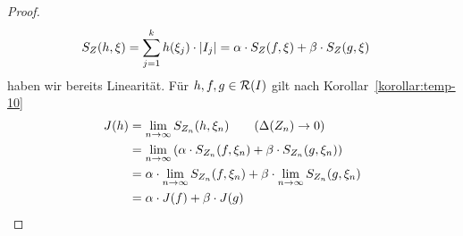 \begin{satz}
\begin{proof}
        \begin{align*}
            S_Z\of{h, \xi} &= \sum_{j=1}^{k} h\of{\xi_j}\cdot\abs{I_j} =\alpha\cdot S_Z\of{f, \xi} + \beta\cdot S_Z\of{g, \xi}
        \end{align*}
        haben wir bereits Linearität. Für $h,f,g\in \mR\of{I}$ gilt nach Korollar~\ref{korollar:temp-10}
        \begin{align*}
            J\of{h} &= \lim_{n\toinf} S_{Z_n}\of{h, \xi_n}\tag{$\Delta\of{Z_n}\fromto 0$}\\
            &= \lim_{n\toinf}\pair{\alpha\cdot S_{Z_n}\of{f, \xi_n} + \beta\cdot S_{Z_n}\of{g, \xi_n}}\\
            &= \alpha\cdot \lim_{\ntoinf} S_{Z_n}\of{f, \xi_n} + \beta\cdot \lim_{\ntoinf} S_{Z_n}\of{g, \xi_n}\\
            &= \alpha\cdot J\of{f} + \beta\cdot J\of{g}\qedhere
        \end{align*}
    \end{proof}
\end{satz}

